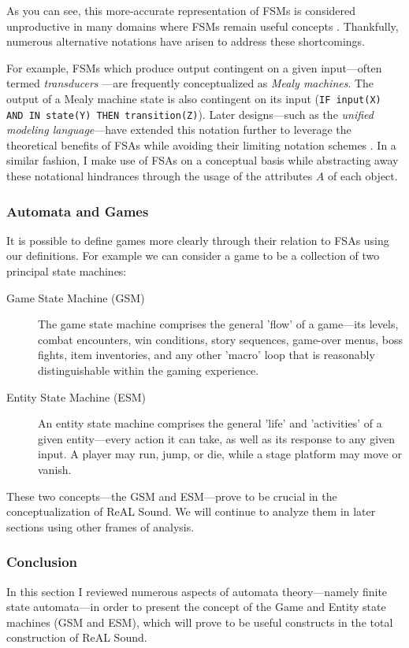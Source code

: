 \documentclass{report}
\newcommand{\rs}{ReAL Sound\xspace}
\begin{document}
As you can see, this more-accurate representation of FSMs is considered unproductive in many domains where FSMs remain useful concepts \cite{state}. Thankfully, numerous alternative notations have arisen to address these shortcomings. 

For example, FSMs which produce output contingent on a given input---often termed \emph{transducers} \cite{FSM}---are frequently conceptualized as \emph{Mealy machines}. The output of a Mealy machine state is also contingent on its input (\texttt{IF input(X) AND IN state(Y) THEN transition(Z)}). Later designs---such as the \emph{unified modeling language}---have extended this notation further to leverage the theoretical benefits of FSAs while avoiding their limiting notation schemes \cite{omg2011umls}. In a similar fashion, I make use of FSAs on a conceptual basis while abstracting away these notational hindrances through the usage of the attributes $A$ of each object. 

\subsubsection{Automata and Games}
It is possible to define games more clearly through their relation to FSAs using our definitions. For example we can consider a game to be a collection of two principal state machines: 
\begin{description}
    \item[Game State Machine (GSM)] The game state machine comprises the general 'flow' of a game---its levels, combat encounters, win conditions, story sequences, game-over menus, boss fights, item inventories, and any other 'macro' loop that is reasonably distinguishable within the gaming experience.
    \item[Entity State Machine (ESM)] An entity state machine comprises the general 'life' and 'activities' of a given entity---every action it can take, as well as its response to any given input. A player may run, jump, or die, while a stage platform may move or vanish.     
\end{description}

These two concepts---the GSM and ESM---prove to be crucial in the conceptualization of \rs. We will continue to analyze them in later sections using other frames of analysis.

\subsubsection{Conclusion}
In this section I reviewed numerous aspects of automata theory---namely finite state automata---in order to present the concept of the Game and Entity state machines (GSM and ESM), which will prove to be useful constructs in the total construction of \rs.
\end{document}
